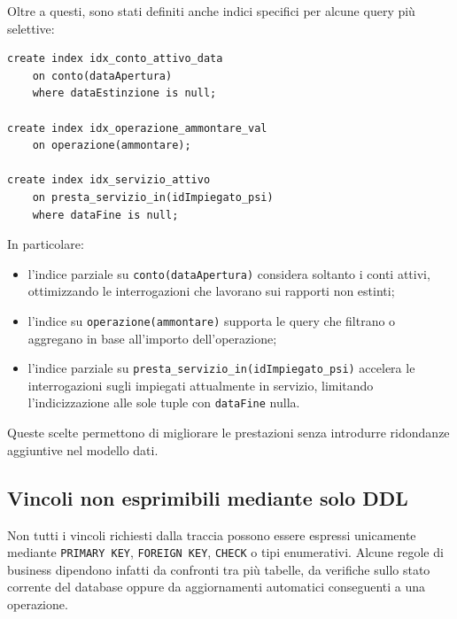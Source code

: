 Oltre a questi, sono stati definiti anche indici specifici per alcune query più selettive:

\begin{lstlisting}[caption={Indici specializzati e parziali}]
create index idx_conto_attivo_data
    on conto(dataApertura)
    where dataEstinzione is null;

create index idx_operazione_ammontare_val
    on operazione(ammontare);

create index idx_servizio_attivo
    on presta_servizio_in(idImpiegato_psi)
    where dataFine is null;
\end{lstlisting}

In particolare:
\begin{itemize}
    \item l'indice parziale su \texttt{conto(dataApertura)} considera soltanto i conti attivi, ottimizzando le interrogazioni che lavorano sui rapporti non estinti;
    \item l'indice su \texttt{operazione(ammontare)} supporta le query che filtrano o aggregano in base all'importo dell'operazione;
    \item l'indice parziale su \texttt{presta\_servizio\_in(idImpiegato\_psi)} accelera le interrogazioni sugli impiegati attualmente in servizio, limitando l'indicizzazione alle sole tuple con \texttt{dataFine} nulla.
\end{itemize}

Queste scelte permettono di migliorare le prestazioni senza introdurre ridondanze aggiuntive nel modello dati.

\subsection{Vincoli non esprimibili mediante solo DDL}
Non tutti i vincoli richiesti dalla traccia possono essere espressi unicamente mediante \texttt{PRIMARY KEY}, \texttt{FOREIGN KEY}, \texttt{CHECK} o tipi enumerativi. Alcune regole di business dipendono infatti da confronti tra più tabelle, da verifiche sullo stato corrente del database oppure da aggiornamenti automatici conseguenti a una operazione.

